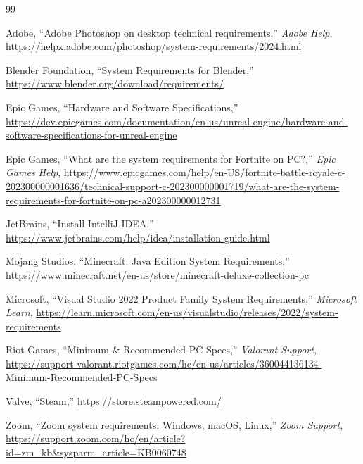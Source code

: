 \documentclass{article}
\begin{document}
\begin{thebibliography}{99}

    Adobe, ``Adobe Photoshop on desktop technical requirements,'' \textit{Adobe Help}, \url{https://helpx.adobe.com/photoshop/system-requirements/2024.html}

    Blender Foundation, ``System Requirements for Blender,'' \url{https://www.blender.org/download/requirements/}

    Epic Games, ``Hardware and Software Specifications,'' \url{https://dev.epicgames.com/documentation/en-us/unreal-engine/hardware-and-software-specifications-for-unreal-engine}

    Epic Games, ``What are the system requirements for Fortnite on PC?,'' \textit{Epic Games Help}, \url{https://www.epicgames.com/help/en-US/fortnite-battle-royale-c-202300000001636/technical-support-c-202300000001719/what-are-the-system-requirements-for-fortnite-on-pc-a202300000012731}

    JetBrains, ``Install IntelliJ IDEA,'' \url{https://www.jetbrains.com/help/idea/installation-guide.html}

    Mojang Studios, ``Minecraft: Java Edition System Requirements,'' \url{https://www.minecraft.net/en-us/store/minecraft-deluxe-collection-pc}

    Microsoft, ``Visual Studio 2022 Product Family System Requirements,'' \textit{Microsoft Learn}, \url{https://learn.microsoft.com/en-us/visualstudio/releases/2022/system-requirements}

    Riot Games, ``Minimum \& Recommended PC Specs,'' \textit{Valorant Support}, \url{https://support-valorant.riotgames.com/hc/en-us/articles/360044136134-Minimum-Recommended-PC-Specs}

    Valve, ``Steam,'' \url{https://store.steampowered.com/}

    Zoom, ``Zoom system requirements: Windows, macOS, Linux,'' \textit{Zoom Support}, \url{https://support.zoom.com/hc/en/article?id=zm_kb&sysparm_article=KB0060748}

\end{thebibliography}

\end{document}
